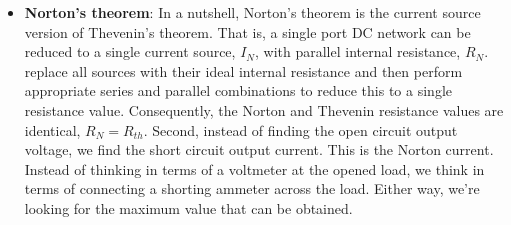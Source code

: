 \documentclass{report}
\begin{document}
\begin{itemize}
            The equivalent resistance is found by shorting the voltage source and then simplifying the circuit. We have:
            \begin{align*}
                200 + 100 || 800 = 288.89 \Omega
            .\end{align*}
            Now, we can find $V_{c}$
            \bigbreak \noindent 
            \bigbreak \noindent 
            In this equivalent circuit,
            \begin{align*}
                I = \frac{8.889}{1000 + 288.89} = 0.006897A
            .\end{align*}
            Thus,
            \begin{align*}
                V_{c} = V_{1k} = 0.006987(1000) = 6.897V
            .\end{align*}
            Now, lets analyse the original circuit. We have 
            \begin{align*}
                R_{\text{EQ}} = (1000 + 200) || 800 + 100 = 580 \Omega
            .\end{align*}
            Thus,
            \begin{align*}
                I &= \frac{10}{580} = 0.0172A, \\
                V_{b} &= 10 - 0.0172(100) = 8.276V
            .\end{align*}
            The current through $c$ is given by 
            \begin{align*}
                I_{c} = I_{200} = I_{1000} = \frac{V_{b}}{1200} = 0.0069A
            .\end{align*}
            Thus,
            \begin{align*}
                V_{c} = 0.0069(1000) = 6.897V
            .\end{align*}
            Notice that the voltages found at $c$ match perfectly, while the voltage at $b$ is only slightly off.
        \item \textbf{Norton's theorem}: In a nutshell, Norton's theorem is the current source version of Thevenin's theorem. 
            \bigbreak \noindent 
            That is, a single port DC network can be reduced to a single current source, $I_{N}$, with parallel internal resistance, $R_{N}$.
            \bigbreak \noindent 
            replace all sources with their ideal internal resistance and then perform appropriate series and parallel combinations to reduce this to a single resistance value. Consequently, the Norton and Thevenin resistance values are identical, $R_{N} = R_{th} $. Second, instead of finding the open circuit output voltage, we find the short circuit output current. This is the Norton current. Instead of thinking in terms of a voltmeter at the opened load, we think in terms of connecting a shorting ammeter across the load. Either way, we're looking for the maximum value that can be obtained.

\end{itemize}
\end{document}
